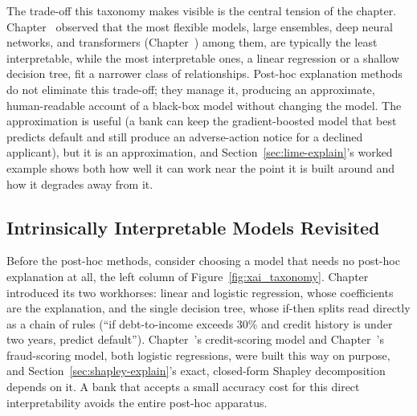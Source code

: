 \documentclass[../ai_in_finance]{subfiles}
\begin{document}
The trade-off this taxonomy makes visible is the central tension of the chapter. Chapter~ observed that the most flexible models, large ensembles, deep neural networks, and transformers (Chapter~) among them, are typically the least interpretable, while the most interpretable ones, a linear regression or a shallow decision tree, fit a narrower class of relationships. Post-hoc explanation methods do not eliminate this trade-off; they manage it, producing an approximate, human-readable account of a black-box model without changing the model. The approximation is useful (a bank can keep the gradient-boosted model that best predicts default and still produce an adverse-action notice for a declined applicant), but it is an approximation, and Section~\ref{sec:lime-explain}'s worked example shows both how well it can work near the point it is built around and how it degrades away from it.

\subsection{Intrinsically Interpretable Models Revisited}
\label{sec:intrinsic-models}

Before the post-hoc methods, consider choosing a model that needs no post-hoc explanation at all, the left column of Figure~\ref{fig:xai_taxonomy}. Chapter~ introduced its two workhorses: linear and logistic regression, whose coefficients are the explanation, and the single decision tree, whose if-then splits read directly as a chain of rules (``if debt-to-income exceeds 30\% and credit history is under two years, predict default''). Chapter~'s credit-scoring model and Chapter~'s fraud-scoring model, both logistic regressions, were built this way on purpose, and Section~\ref{sec:shapley-explain}'s exact, closed-form Shapley decomposition depends on it. A bank that accepts a small accuracy cost for this direct interpretability avoids the entire post-hoc apparatus.
\end{document}
